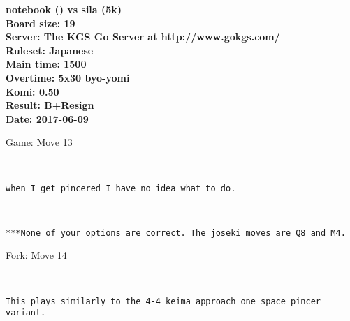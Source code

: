 \documentclass[twocolumn]{article}
\begin{document}
\begin{titlepage}
    \null
    \vfill
    \begin{center}
        \textbf{notebook () vs sila (5k)}\\
        \textbf{Board size: 19}\\
        \textbf{Server: The KGS Go Server at http://www.gokgs.com/}\\
        \textbf{Ruleset: Japanese}\\
        \textbf{Main time: 1500}\\
        \textbf{Overtime: 5x30 byo-yomi}\\
        \textbf{Komi: 0.50}\\
        \textbf{Result: B+Resign}\\
        \textbf{Date: 2017-06-09}
    \end{center}
    \vfill
\end{titlepage}
\newpage
\tableofcontents
\newpage
\begin{section}{Game: Move 13}
\begin{center}
\cleargoban
{}
\showfullgoban
\\\begin{lstlisting}
when I get pincered I have no idea what to do.\end{lstlisting}
\end{center}
\begin{center}
\cleargoban
{}
\showfullgoban
\\\begin{lstlisting}
***None of your options are correct. The joseki moves are Q8 and M4.\end{lstlisting}
\end{center}
\end{section}
\begin{subsection}{Fork: Move 14}
\begin{center}
\cleargoban
{}
\showfullgoban
\\\begin{lstlisting}
This plays similarly to the 4-4 keima approach one space pincer variant.\end{lstlisting}
\end{center}
\end{subsection}
\end{document}
